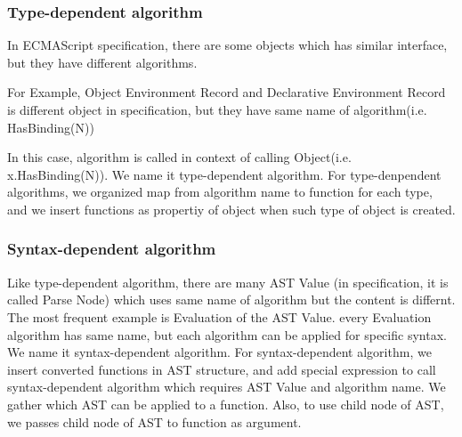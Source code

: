 \subsubsection{Type-dependent algorithm}

In ECMAScript specification, there are some objects which has similar interface, but they have different algorithms. 

For Example, Object Environment Record and Declarative Environment Record is different object in specification, but they have same name of algorithm(i.e. HasBinding(N))

In this case, algorithm is called in context of calling Object(i.e. x.HasBinding(N)). We name it type-dependent algorithm.
For type-denpendent algorithms, we organized map from algorithm name to function for each type,
 and we insert functions as propertiy of object when such type of object is created.

 \subsubsection{Syntax-dependent algorithm}
 
 Like type-dependent algorithm, there are many AST Value (in specification, it is called Parse Node) which uses same name of algorithm but the content is differnt.
The most frequent example is Evaluation of the AST Value. every Evaluation algorithm has same name, but each algorithm can be applied for specific syntax. We name it syntax-dependent algorithm.
For syntax-dependent algorithm, we insert converted functions in AST structure, and add special expression to call syntax-dependent algorithm which requires AST Value and algorithm name.
We gather which AST can be applied to a function. Also, to use child node of AST, we passes child node of AST to function as argument.

